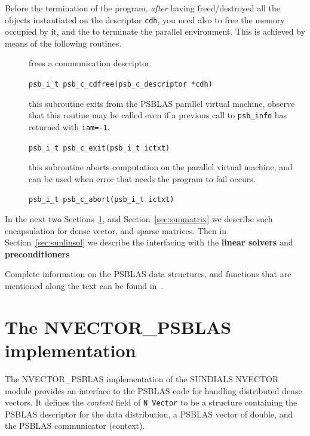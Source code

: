 \documentclass[twoside,a4paper]{refart}
\theoremstyle{definition}
\begin{document}
	Before the termination of the program, \textit{after} having freed/destroyed all the objects instantiated on the descriptor \texttt{cdh}, you need also to free the memory occupied by it, and the to terminate the parallel environment. This is achieved by means of the following routines.
	\begin{description}
		\item[] frees a communication descriptor
		
		 \lstinline[style=CStyle]|psb_i_t psb_c_cdfree(psb_c_descriptor *cdh)|
		
		\item[] this subroutine exits from the PSBLAS parallel virtual machine, observe that this routine may be called even if a previous call to \lstinline[style=CStyle]|psb_info| has returned with \lstinline[style=CStyle]|iam=-1|.
		
		 \lstinline[style=CStyle]|psb_i_t psb_c_exit(psb_i_t ictxt)|
		
		\item[] this subroutine aborts computation on the parallel virtual machine, and can be used when error that needs the program to fail occurs.
		
		 \lstinline[style=CStyle]|psb_i_t psb_c_abort(psb_i_t ictxt)| 		
		
	\end{description}


	
	In the next two Sections~\ref{sec:nvector}, and Section~\ref{sec:sunmatrix} we describe such encapsulation for dense vector, and sparse matrices. Then in Section~\ref{sec:sunlinsol} we describe the interfacing with the \textbf{linear solvers} and \textbf{preconditioners}

	Complete information on the PSBLAS data structures, and functions that are mentioned along the text can be found in~\cite{psblasguide}.
	
	
	\section{The NVECTOR\_PSBLAS implementation}\label{sec:nvector}
	The NVECTOR\_PSBLAS implementation of the SUNDIALS NVECTOR module provides an interface to the PSBLAS code for handling distributed dense vectors.
	It defines the \emph{content} field of \texttt{N\_Vector} to be a structure containing the PSBLAS descriptor for the data distribution, a PSBLAS vector of double, and the PSBLAS communicator (context).
	
\end{document}
